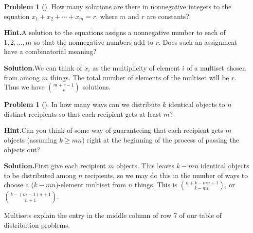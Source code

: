 \documentclass[10pt,]{book}
\theoremstyle{plain}
\theoremstyle{definition}
\newtheorem{activity}[project]{Problem}
\theoremstyle{definition}
\numberwithin{equation}{chapter}
\begin{document}
\begin{activity}[]\label{activity-127}
How many solutions are there in nonnegative integers to the equation \(x_1+x_2+ \cdots +x_m = r\), where \(m\) and \(r\) are constants?%
\par\medskip\noindent%
\textbf{Hint.}\quad A solution to the equations assigns a nonnegative number to each of \(1,2,\ldots, m\) so that the nonnegative numbers add to \(r\). Does such an assignment have a combinatorial meaning?%
\par\medskip\noindent%
\textbf{Solution.}\quad We can think of \(x_i\) as the multiplicity of element \(i\) of a multiset chosen from among \(m\) things. The total number of elements of the multiset will be \(r\). Thus we have \(\binom{m+r-1}{r}\) solutions.%
\end{activity}
\begin{activity}[]\label{k-obj-n-recip}
In how many ways can we distribute \(k\) identical objects to \(n\) distinct recipients so that each recipient gets at least \(m\)?%
\par\medskip\noindent%
\textbf{Hint.}\quad Can you think of some way of guaranteeing that each recipient gets \(m\) objects (assuming \(k \ge mn\)) right at the beginning of the process of passing the objects out?%
\par\medskip\noindent%
\textbf{Solution.}\quad First give each recipient \(m\) objects.  This leaves \(k-mn\) identical objects to be distributed among \(n\) recipients, so we may do this in the number of ways to choose a (\(k-mn\))-element multiset from \(n\) things.  This is \(\binom{n+k-mn+1}{k-mn}\), or \(\binom{k-(m-1)n+1}{n+1}\).%
\end{activity}
Multisets explain the entry in the middle column of row 7 of our table of distribution problems.%
\typeout{************************************************}
\typeout{************************************************}
\end{document}
